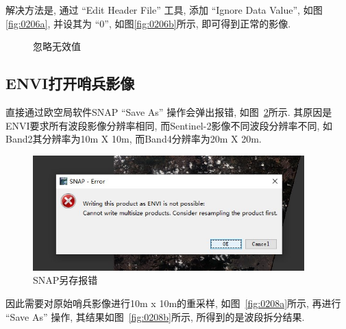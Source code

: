 解决方法是, 通过 ``Edit Header File'' 工具, 添加 ``Ignore Data Value'', 如图\ref{fig:0206a}, 并设其为 ``0'', 如图\ref{fig:0206b}所示, 即可得到正常的影像.

\begin{figure}[htbp]
    \centering
    \qquad
    \caption{忽略无效值}
    \label{fig:0206}
\end{figure}

\subsection{ENVI打开哨兵影像}
直接通过欧空局软件SNAP ``Save As'' 操作会弹出报错, 如图~\ref{fig:0207}所示. 其原因是ENVI要求所有波段影像分辨率相同, 而Sentinel-2影像不同波段分辨率不同, 如Band2其分辨率为10m X 10m, 而Band4分辨率为20m X 20m.

\begin{figure}[!htbp]
    \centering
    \includegraphics[height=12em]{pic/q3_01.jpg}
    \caption{SNAP另存报错}
    \label{fig:0207}
\end{figure}

因此需要对原始哨兵影像进行10m x 10m的重采样, 如图~\ref{fig:0208a}所示, 再进行 ``Save As'' 操作, 其结果如图~\ref{fig:0208b}所示, 所得到的是波段拆分结果. 


